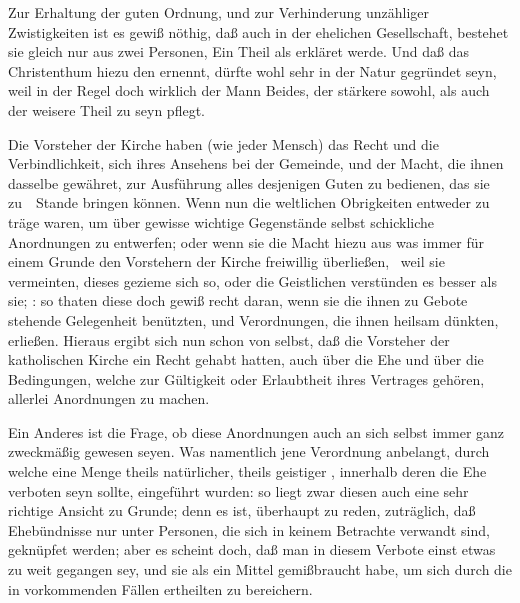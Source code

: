 \begin{aufza}
\begin{RWanm}
\end{RWanm} 
\item Zur Erhaltung der guten Ordnung, und zur Verhinderung unzähliger Zwistigkeiten ist es gewiß nöthig, daß auch in der ehelichen Gesellschaft, bestehet sie gleich nur aus zwei Personen, Ein Theil als  erkläret werde. Und daß das Christenthum hiezu den  ernennt, dürfte wohl sehr in der Natur gegründet seyn, weil in der Regel doch wirklich der Mann Beides, der stärkere sowohl, als auch der weisere Theil zu seyn pflegt.
\item Die Vorsteher der Kirche haben (wie jeder Mensch) das Recht und die Verbindlichkeit, sich ihres Ansehens bei der Gemeinde, und der Macht, die ihnen dasselbe gewähret, zur Ausführung alles desjenigen Guten zu bedienen, das sie zu~\ Stande bringen können. Wenn nun die weltlichen Obrigkeiten entweder zu träge waren, um über gewisse wichtige Gegenstände selbst schickliche Anordnungen zu entwerfen; oder wenn sie die Macht hiezu aus was immer für einem Grunde den Vorstehern der Kirche freiwillig überließen, \zB\  weil sie vermeinten, dieses gezieme sich so, oder die Geistlichen verstünden es besser als sie; \usw : so thaten diese doch gewiß recht daran, wenn sie die ihnen zu Gebote stehende Gelegenheit benützten, und Verordnungen, die ihnen heilsam dünkten, erließen. Hieraus ergibt sich nun schon von selbst, daß die Vorsteher der katholischen Kirche ein Recht gehabt hatten, auch über die Ehe und über die Bedingungen, welche zur Gültigkeit oder Erlaubtheit ihres Vertrages gehören, allerlei Anordnungen zu machen.
\begin{RWanm} 
Ein Anderes ist die Frage, ob diese Anordnungen auch an sich selbst immer ganz zweckmäßig gewesen seyen. Was namentlich jene Verordnung anbelangt, durch welche eine Menge theils natürlicher, theils geistiger , innerhalb deren die Ehe verboten seyn sollte, eingeführt wurden: so liegt zwar diesen auch eine sehr richtige Ansicht zu Grunde; denn es ist, überhaupt zu reden, zuträglich, daß Ehebündnisse nur unter Personen, die sich in keinem Betrachte verwandt sind, geknüpfet werden; aber es scheint doch, daß man in diesem Verbote einst etwas zu weit gegangen sey, und sie als ein Mittel gemißbraucht habe, um sich durch die in vorkommenden Fällen ertheilten  zu bereichern. 
\end{RWanm}

\end{aufza}

